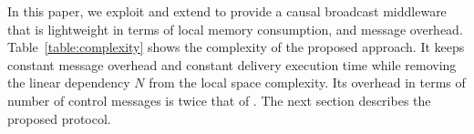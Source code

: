 





In this paper, we exploit and extend \PCBROADCAST to provide a causal broadcast
middleware that is lightweight in terms of local memory consumption, and message
overhead. Table~\ref{table:complexity} shows the complexity of the proposed
approach. It keeps constant message overhead and constant delivery execution
time while removing the linear dependency $N$ from the local space
complexity. Its overhead in terms of number of control messages is twice that of
\PCBROADCAST.
The next section describes the proposed protocol.


